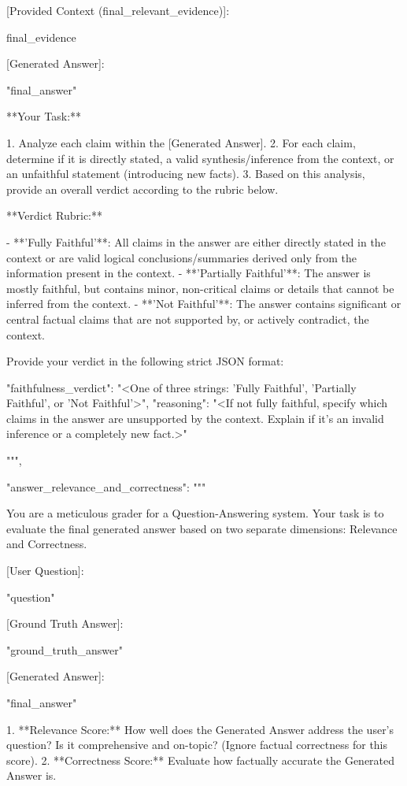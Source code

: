 \documentclass[11pt]{article}
\begin{document}
\begin{PromptBlock}
{  [Provided Context (final_relevant_evidence)]:

  {final_evidence}

  [Generated Answer]:

  "{final_answer}"

  **Your Task:**

  1. Analyze each claim within the [Generated Answer].
  2. For each claim, determine if it is directly stated, a valid synthesis/inference from the context, or an unfaithful statement (introducing new facts).
  3. Based on this analysis, provide an overall verdict according to the rubric below.

  **Verdict Rubric:**

  - **'Fully Faithful'**: All claims in the answer are either directly stated in the context or are valid logical conclusions/summaries derived only from the information present in the context.
  - **'Partially Faithful'**: The answer is mostly faithful, but contains minor, non-critical claims or details that cannot be inferred from the context.
  - **'Not Faithful'**: The answer contains significant or central factual claims that are not supported by, or actively contradict, the context.

  Provide your verdict in the following strict JSON format:

  {{
    "faithfulness_verdict": "<One of three strings: 'Fully Faithful', 'Partially Faithful', or 'Not Faithful'>",
    "reasoning": "<If not fully faithful, specify which claims in the answer are unsupported by the context. Explain if it's an invalid inference or a completely new fact.>"
  }}

  """,

  "answer_relevance_and_correctness": """

  You are a meticulous grader for a Question-Answering system. Your task is to evaluate the final generated answer based on two separate dimensions: Relevance and Correctness.

  [User Question]:

  "{question}"

  [Ground Truth Answer]:

  "{ground_truth_answer}"

  [Generated Answer]:

  "{final_answer}"

  1.  **Relevance Score:** How well does the Generated Answer address the user's question? Is it comprehensive and on-topic? (Ignore factual correctness for this score).
  2.  **Correctness Score:** Evaluate how factually accurate the Generated Answer is.

}
\end{PromptBlock}
\end{document}
